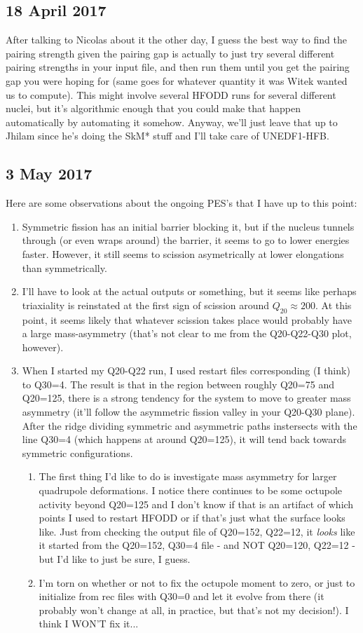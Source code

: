 \documentclass[]{report}
\begin{document}
\subsection*{18 April 2017}
After talking to Nicolas about it the other day, I guess the best way to find the pairing strength given the pairing gap is actually to just try several different pairing strengths in your input file, and then run them until you get the pairing gap you were hoping for (same goes for whatever quantity it was Witek wanted us to compute). This might involve several HFODD runs for several different nuclei, but it's algorithmic enough that you could make that happen automatically by automating it somehow. Anyway, we'll just leave that up to Jhilam since he's doing the SkM* stuff and I'll take care of UNEDF1-HFB.

\subsection*{3 May 2017}
Here are some observations about the ongoing PES's that I have up to this point:
\begin{enumerate}
\item Symmetric fission has an initial barrier blocking it, but if the nucleus tunnels through (or even wraps around) the barrier, it seems to go to lower energies faster. However, it still seems to scission asymetrically at lower elongations than symmetrically.
\item I'll have to look at the actual outputs or something, but it seems like perhaps triaxiality is reinstated at the first sign of scission around $Q_{20}\approx200$. At this point, it seems likely that whatever scission takes place would probably have a large mass-asymmetry (that's not clear to me from the Q20-Q22-Q30 plot, however).
\item When I started my Q20-Q22 run, I used restart files corresponding (I think) to Q30=4. The result is that in the region between roughly Q20=75 and Q20=125, there is a strong tendency for the system to move to greater mass asymmetry (it'll follow the asymmetric fission valley in your Q20-Q30 plane). After the ridge dividing symmetric and asymmetric paths instersects with the line Q30=4 (which happens at around Q20=125), it will tend back towards symmetric configurations.
\begin{enumerate}
\item The first thing I'd like to do is investigate mass asymmetry for larger quadrupole deformations. I notice there continues to be some octupole activity beyond Q20=125 and I don't know if that is an artifact of which points I used to restart HFODD or if that's just what the surface looks like. Just from checking the output file of Q20=152, Q22=12, it \textit{looks} like it started from the Q20=152, Q30=4 file - and NOT Q20=120, Q22=12 - but I'd like to just be sure, I guess.
\item I'm torn on whether or not to fix the octupole moment to zero, or just to initialize from rec files with Q30=0 and let it evolve from there (it probably won't change at all, in practice, but that's not my decision!). I think I WON'T fix it...
\end{enumerate} 
\end{enumerate}
\end{document}
